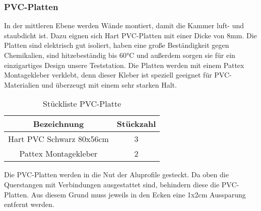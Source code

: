 \subsubsection{PVC-Platten}
In der mittleren Ebene werden Wände montiert, damit die Kammer luft- und staubdicht ist. Dazu eignen sich Hart PVC-Platten mit einer Dicke von 8mm. Die Platten sind elektrisch gut isoliert, haben eine große Beständigkeit gegen Chemikalien, sind hitzebeständig bis 60°C  und außerdem sorgen sie für ein einzigartiges Design unsere Teststation. Die Platten werden mit einem Pattex Montagekleber verklebt, denn dieser Kleber ist speziell geeignet für PVC- Materialien und überzeugt mit einem sehr starken Halt. 
\vspace{5mm}
\begin{table}[H]
    \centering
    \begin{tabular}{ | c | c | } 
  \hline
   \textbf{Bezeichnung} & \textbf{Stückzahl}\\ 
  \hline
   Hart PVC Schwarz 80x56cm & 3\\ 
  \hline
   Pattex Montagekleber & 2 \\ 
  \hline
\end{tabular}
    \caption{Stückliste PVC-Platte}
\end{table}

Die PVC-Platten werden in die Nut der Aluprofile gesteckt. Da oben die Querstangen mit Verbindungen ausgestattet sind, behindern diese die PVC-Platten. Aus diesem Grund muss jeweils in den Ecken eine 1x2cm Aussparung entfernt werden. 